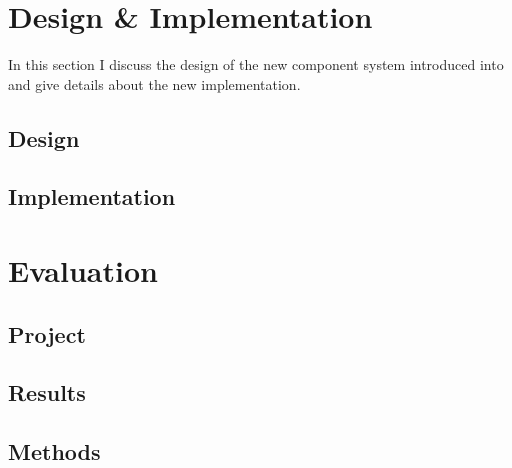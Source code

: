 \section{Design \& Implementation}
In this section I discuss the design of the new component system introduced into \UH{} and give details about the new
implementation.

\subsection{Design}


\subsection{Implementation}



\section{Evaluation}
\subsection{Project}
\subsection{Results}
\subsection{Methods}
